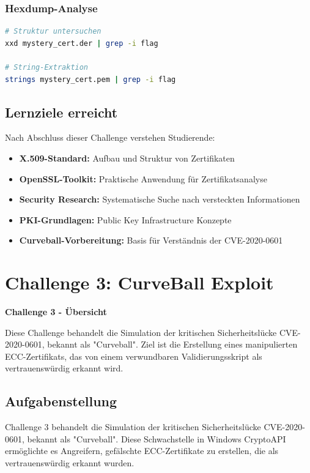 \documentclass{article}
\begin{document}
\subsubsection{Hexdump-Analyse}
\begin{lstlisting}[language=bash]
# Struktur untersuchen
xxd mystery_cert.der | grep -i flag

# String-Extraktion
strings mystery_cert.pem | grep -i flag
\end{lstlisting}

\subsection{Lernziele erreicht}
Nach Abschluss dieser Challenge verstehen Studierende:

\begin{itemize}
    \item \textbf{X.509-Standard:} Aufbau und Struktur von Zertifikaten
    \item \textbf{OpenSSL-Toolkit:} Praktische Anwendung für Zertifikatsanalyse
    \item \textbf{Security Research:} Systematische Suche nach versteckten Informationen
    \item \textbf{PKI-Grundlagen:} Public Key Infrastructure Konzepte
    \item \textbf{Curveball-Vorbereitung:} Basis für Verständnis der CVE-2020-0601
\end{itemize}

\clearpage

\section{Challenge 3: CurveBall Exploit}

\begin{solutionbox}
\textbf{Challenge 3 - Übersicht}

Diese Challenge behandelt die Simulation der kritischen Sicherheitslücke CVE-2020-0601, bekannt als "Curveball". Ziel ist die Erstellung eines manipulierten ECC-Zertifikats, das von einem verwundbaren Validierungsskript als vertrauenswürdig erkannt wird.
\end{solutionbox}

\subsection{Aufgabenstellung}

Challenge 3 behandelt die Simulation der kritischen Sicherheitslücke CVE-2020-0601, bekannt als "Curveball". Diese Schwachstelle in Windows CryptoAPI ermöglichte es Angreifern, gefälschte ECC-Zertifikate zu erstellen, die als vertrauenswürdig erkannt wurden.
\end{document}

